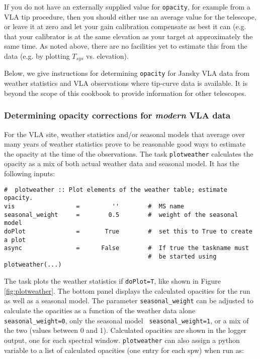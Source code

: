 If you do not have an externally supplied value for {\tt opacity}, for
example from a VLA tip procedure, then you should either use an
average value for the telescope, or leave it at zero and let
your gain calibration compensate as best it can (e.g. that your 
calibrator is at the same elevation as your target at approximately 
the same time. As noted above, there are no facilities yet to estimate this from the
data (e.g. by plotting $T_{sys}$ vs. elevation).

Below, we give instructions for determining {\tt opacity} for Jansky VLA
data from weather statistics and VLA observations where tip-curve data
is available.  It is beyond the scope of this cookbook to provide
information for other telescopes.

\subsubsection{Determining opacity corrections for {\em modern} VLA data}
\label{section:cal.prior.opacity.evla}

For the VLA site, weather statistics and/or seasonal models that
average over many years of weather statistics prove to be reasonable good
ways to estimate the opacity at the time of the observations. The task
{\tt plotweather} calculates the opacity as a mix of both actual
weather data and seasonal model. It has the following inputs: 

\small
\begin{verbatim}
#  plotweather :: Plot elements of the weather table; estimate opacity.
vis                 =         ''        #  MS name
seasonal_weight     =        0.5        #  weight of the seasonal model
doPlot              =       True        #  set this to True to create a plot
async               =      False        #  If true the taskname must
                                        #  be started using plotweather(...)
\end{verbatim}
\normalsize

The task plots the weather statistics if {\tt doPlot=T}, like shown in
Figure\,\ref{fig:plotweather}. The bottom panel displays the
calculated opacities for the run as well as a seasonal model. The
parameter {\tt seasonal\_weight} can be adjusted to calculate the
opacities as a function of the weather data alone {\tt
  seasonal\_weight=0}, only the seasonal model {\tt
  seasonal\_weight=1}, or a mix of the two (values between 0 and
1). Calculated opacities are shown in the logger output, one for each
spectral window. {\tt plotweather} can also assign a python variable
to a list of calculated opacities (one entry for each spw) when run as:

